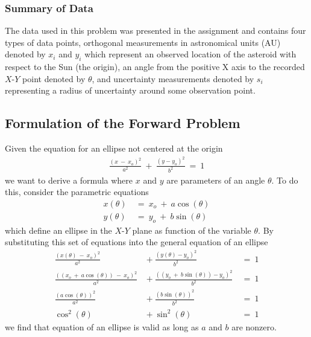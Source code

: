 \documentclass[12pt,runningheads]{article}
\begin{document}
\subsubsection*{Summary of Data}
The data used in this problem was presented in the assignment and contains four types of data points, orthogonal measurements in astronomical units (AU) denoted by $x_{i}$ and $y_{i}$ which represent an observed location of the asteroid with respect to the Sun (the origin), an angle from the positive X axis to the recorded $X$-$Y$ point denoted by $\theta$, and uncertainty measurements denoted by $s_{i}$ representing a radius of uncertainty around some observation point.
\pagebreak

\subsection*{Formulation of the Forward Problem}
Given the equation for an ellipse not centered at the origin
\begin{align*}
\frac{(x\ -\ x_{o})^2}{a^2}\ +\ \frac{(y-y_{o})^2}{b^2}\  =\ 1
\end{align*}
we want to derive a formula where $x$ and $y$ are parameters of an angle $\theta$. To do this, consider the parametric equations
\begin{align*}
x(\theta)\ &=\ x_{o}\ +\ a\cos(\theta) \\
y(\theta)\ &=\ y_{o}\ +\ b\sin(\theta)
\end{align*}
which define an ellipse in the $X$-$Y$ plane as function of the variable $\theta$. By substituting this set of equations into the general equation of an ellipse
\begin{align*}
\frac{(x(\theta)\ -\ x_{o})^2}{a^2}\ &+\ \frac{(y(\theta)-y_{o})^2}{b^2}\  &=\ 1\\
\frac{((x_{o}\ +\ a\cos(\theta))\ -\ x_{o})^2}{a^2}\ &+\ \frac{((y_{o}\ +\ b\sin(\theta))-y_{o})^2}{b^2}\  &=\ 1\\
\frac{(a\cos(\theta))^2}{a^2}\ &+\ \frac{(b\sin(\theta))^2}{b^2}\ &=\ 1\\
\cos^{2}(\theta)\ &+\ \sin^{2}(\theta)\ &=\ 1
\end{align*}
we find that equation of an ellipse is valid as long as $a$ and $b$ are nonzero.
\pagebreak
\end{document}
